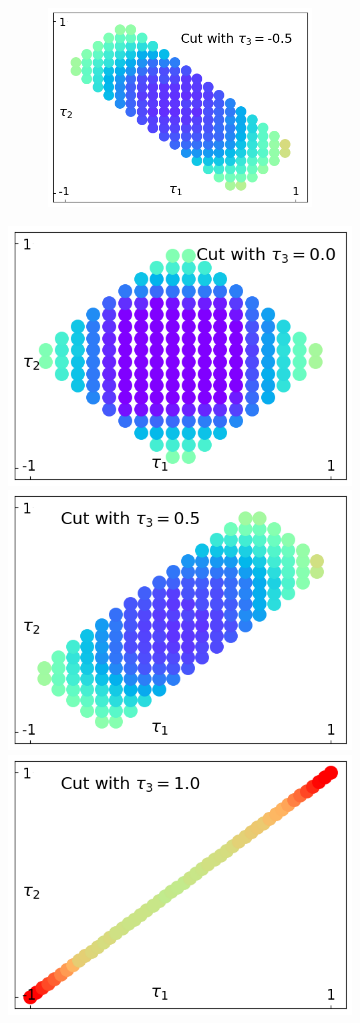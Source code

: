\documentclass[10pt,letterpaper]{article} %
\begin{document}
\begin{figure}
\begin{subfigure}{0.9\textwidth}
\begin{subfigure}{.333\textwidth}
\includegraphics[width=.95\columnwidth]{images/corte2-2.png} \\
\end{subfigure}
\includegraphics[width=.322\columnwidth]{images/corte3-2.png}
\includegraphics[width=.322\columnwidth]{images/corte4-2.png}
\includegraphics[width=.322\columnwidth]{images/corte5-2.png}
\end{subfigure}%
\begin{subfigure}{0.1\textwidth}

\end{subfigure}
\end{figure}
\end{document}
